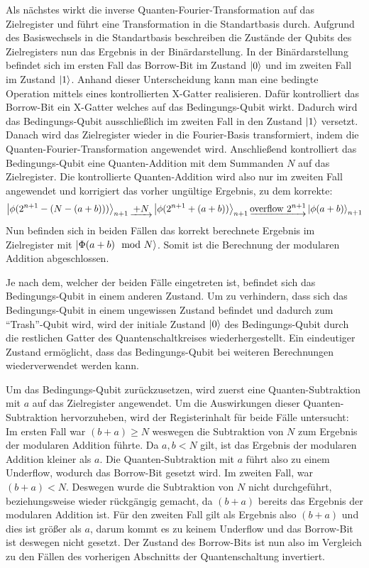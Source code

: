 Als nächstes wirkt die inverse Quanten-Fourier-Transformation auf das Zielregister und führt eine Transformation in die Standartbasis durch.
Aufgrund des Basiswechsels in die Standartbasis beschreiben die Zustände der Qubits des Zielregisters nun das Ergebnis in der Binärdarstellung.
In der Binärdarstellung befindet sich im ersten Fall das Borrow-Bit im Zustand \(\ket{0}\) und im zweiten Fall im Zustand \(\ket{1}\).
Anhand dieser Unterscheidung kann man eine bedingte Operation mittels eines kontrollierten X-Gatter realisieren.
Dafür kontrolliert das Borrow-Bit ein X-Gatter welches auf das Bedingungs-Qubit wirkt.
Dadurch wird das Bedingungs-Qubit ausschließlich im zweiten Fall in den Zustand \(\ket{1}\) versetzt.
Danach wird das Zielregister wieder in die Fourier-Basis transformiert, 
indem die Quanten-Fourier-Transformation angewendet wird.
Anschließend kontrolliert das Bedingungs-Qubit eine Quanten-Addition mit dem Summanden \(N\) auf das Zielregister.
Die kontrollierte Quanten-Addition wird also nur im zweiten Fall angewendet und korrigiert das vorher ungültige Ergebnis,
zu dem korrekte:
\[
\ket{\phi(2^{n+1}-(N-(a+b)))}_{n+1} \underrightarrow{~+N~} 
\ket{\phi(2^{n+1}+(a+b))}_{n+1} \underrightarrow{\text{overflow }2^{n+1}}
\ket{\phi(a+b)}_{n+1}
  \]
Nun befinden sich in beiden Fällen das korrekt berechnete Ergebnis im Zielregister mit \(\ket{\Phi(a+b)\mod N}\).
Somit ist die Berechnung der modularen Addition abgeschlossen.

Je nach dem, welcher der beiden Fälle eingetreten ist, befindet sich das Bedingungs-Qubit in einem anderen Zustand.
Um zu verhindern, dass sich das Bedingungs-Qubit in einem ungewissen Zustand befindet und dadurch zum "`Trash"'-Qubit wird, 
wird der initiale Zustand \(\ket{0}\) des Bedingungs-Qubit durch die restlichen Gatter des Quantenschaltkreises wiederhergestellt.
Ein eindeutiger Zustand ermöglicht, dass das Bedingungs-Qubit bei weiteren Berechnungen wiederverwendet werden kann.

Um das Bedingungs-Qubit zurückzusetzen, 
wird zuerst eine Quanten-Subtraktion mit \(a\) auf das Zielregister angewendet.
Um die Auswirkungen dieser Quanten-Subtraktion hervorzuheben, wird der Registerinhalt für beide Fälle untersucht:
Im ersten Fall war \((b+a) \geq N\) weswegen die Subtraktion von \(N\) zum Ergebnis der modularen Addition führte.
Da \(a, b < N\) gilt, ist das Ergebnis der modularen Addition kleiner als \(a\).
Die Quanten-Subtraktion mit \(a\) führt also zu einem Underflow, wodurch das Borrow-Bit gesetzt wird.
Im zweiten Fall, war \((b+a) < N\).
Deswegen wurde die Subtraktion von \(N\) nicht durchgeführt, 
beziehungsweise wieder rückgängig gemacht, da \((b+a)\) bereits das Ergebnis der modularen Addition ist.
Für den zweiten Fall gilt als Ergebnis also \((b+a)\) und dies ist größer als \(a\), 
darum kommt es zu keinem Underflow und das Borrow-Bit ist deswegen nicht gesetzt.
Der Zustand des Borrow-Bits ist nun also im Vergleich zu den Fällen des vorherigen Abschnitts der Quantenschaltung invertiert.

